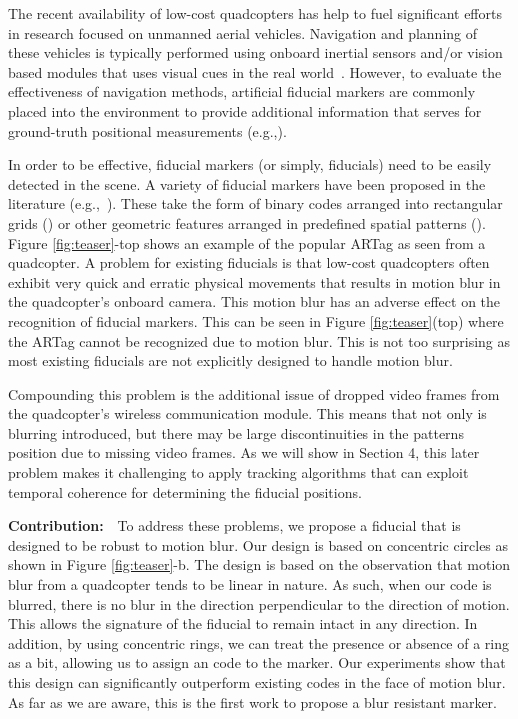 \documentclass[runningheads]{llncs}
\begin{document}
The recent availability of low-cost quadcopters has help to fuel significant efforts in
research focused on unmanned aerial vehicles.  Navigation and planning of
these vehicles is typically performed using onboard inertial sensors and/or
vision based modules that uses visual cues in the real world~\cite{Davison:2007}.
However, to evaluate the effectiveness of navigation methods, artificial
fiducial markers are commonly placed into the environment to provide
additional information that serves for ground-truth
positional measurements (e.g.,\cite{Bosnak:2012,Lim09,Klopschitz:2007}).

In order to be effective, fiducial markers (or simply, fiducials) need
to be easily detected in the scene.  A variety of fiducial markers
have been proposed in the literature
(e.g.,~\cite{NaimarkF02,ARToolkit02,Fiala05,Pitag13,runetag11}).
These take the form of binary codes arranged into rectangular grids (\cite{ARToolkit02,Fiala05})
or other geometric features arranged in predefined spatial patterns
(\cite{NaimarkF02,Pitag13,runetag11}).
Figure \ref{fig:teaser}-top shows an example of the popular ARTag\cite{Fiala05} as
seen from a quadcopter.  A problem for existing fiducials is  that low-cost quadcopters
often exhibit very quick and erratic physical movements that
results in motion blur in the quadcopter's onboard camera.  This motion blur has
an adverse effect on the  recognition of fiducial  markers.  This can be seen in
Figure \ref{fig:teaser}(top) where the ARTag cannot be recognized due to motion
blur. This is not too surprising as most  existing fiducials are not explicitly
designed to handle motion blur.

Compounding this problem is the additional issue of dropped video frames from
the quadcopter's wireless communication module.   This means that not only is blurring
introduced, but there may be large discontinuities in the patterns position due
to missing video frames.  As we will show in Section 4, this later problem
makes it challenging to apply tracking algorithms that can exploit temporal
coherence for determining the fiducial positions.

\noindent\textbf{Contribution:}~~To address these problems, we propose a
fiducial that is designed to be robust to motion blur.  Our design is based on
concentric circles as shown in Figure \ref{fig:teaser}-b.  The design is based
on the observation that motion blur from a quadcopter tends to be linear in
nature.  As such, when our code is blurred, there is no blur in the direction
perpendicular to the direction of motion.   This allows the signature of the
fiducial to remain intact in any direction.  In addition, by using concentric
rings, we can treat the presence or absence of a ring as a bit, allowing us to
assign an code to the marker.  Our experiments show that this design can
significantly outperform existing codes in the face of motion blur. As far as
we are aware, this is the first work to propose a blur resistant marker.
\end{document}
